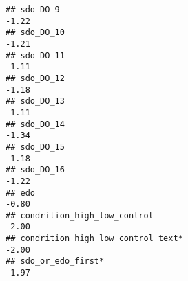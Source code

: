 \documentclass[
]{article}
\begin{document}
\begin{verbatim}
## sdo_DO_9                                                                                                                                                                                                                      -1.22
## sdo_DO_10                                                                                                                                                                                                                     -1.21
## sdo_DO_11                                                                                                                                                                                                                     -1.11
## sdo_DO_12                                                                                                                                                                                                                     -1.18
## sdo_DO_13                                                                                                                                                                                                                     -1.11
## sdo_DO_14                                                                                                                                                                                                                     -1.34
## sdo_DO_15                                                                                                                                                                                                                     -1.18
## sdo_DO_16                                                                                                                                                                                                                     -1.22
## edo                                                                                                                                                                                                                           -0.80
## condrition_high_low_control                                                                                                                                                                                                   -2.00
## condrition_high_low_control_text*                                                                                                                                                                                             -2.00
## sdo_or_edo_first*                                                                                                                                                                                                             -1.97

\end{verbatim}
\end{document}
